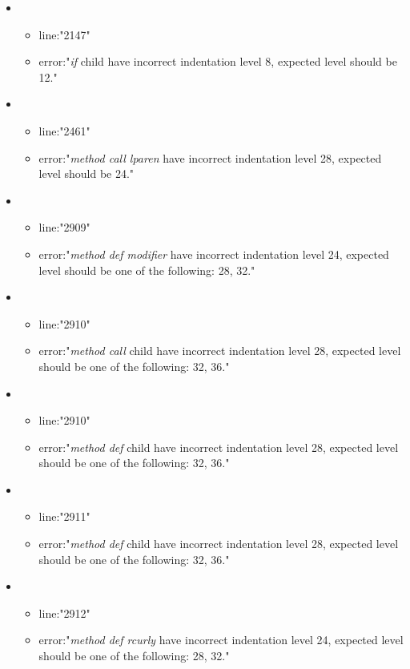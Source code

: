 \begin{itemize}
\begin{itemize}
	\end{itemize}
	\item 
	\begin{itemize} 
		\item line:"2147" 
		\item error:"\emph{if} child have incorrect indentation level 8, expected level should be 12." 
	\end{itemize}
	\item 
	\begin{itemize} 
		\item line:"2461" 
		\item error:"\emph{method call lparen} have incorrect indentation level 28, expected level should be 24." 
	\end{itemize}
	\item 
	\begin{itemize} 
		\item line:"2909" 
		\item error:"\emph{method def modifier} have incorrect indentation level 24, expected level should be one of the following: 28, 32." 
	\end{itemize}
	\item 
	\begin{itemize} 
		\item line:"2910" 
		\item error:"\emph{method call} child have incorrect indentation level 28, expected level should be one of the following: 32, 36." 
	\end{itemize}
	\item 
	\begin{itemize} 
		\item line:"2910" 
		\item error:"\emph{method def} child have incorrect indentation level 28, expected level should be one of the following: 32, 36." 
	\end{itemize}
	\item 
	\begin{itemize} 
		\item line:"2911" 
		\item error:"\emph{method def} child have incorrect indentation level 28, expected level should be one of the following: 32, 36." 
	\end{itemize}
	\item 
	\begin{itemize} 
		\item line:"2912" 
		\item error:"\emph{method def rcurly} have incorrect indentation level 24, expected level should be one of the following: 28, 32." 

\end{itemize}
\end{itemize}
